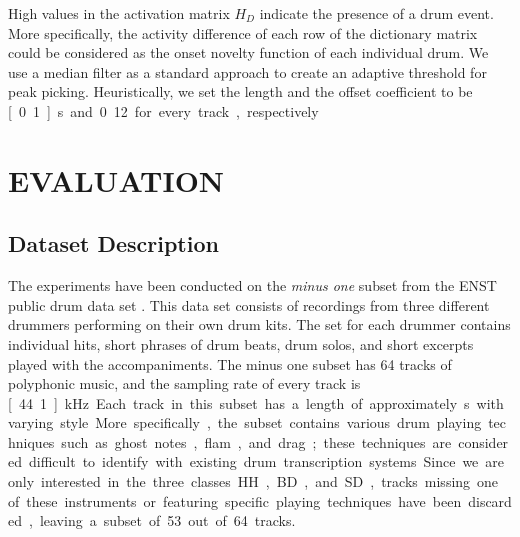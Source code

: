 \documentclass{article}
\begin{document}
High values in the activation matrix $H_D$ indicate the presence of a drum event. More specifically, the activity difference of each row of the dictionary matrix could be considered as the onset novelty function of each individual drum. We use a median filter as a standard approach to create an adaptive threshold for peak picking. Heuristically, we set the length and the offset coefficient to be \unit[0.1]{s} and 0.12 for every track, respectively. 
\vspace{-2mm}
\section{EVALUATION}\label{sec:Evaluation}
\subsection{Dataset Description}\label{subsec:data set description}

The experiments have been conducted on the \textit{minus one} subset from the ENST public drum data set \cite{gillet_enst-drums:_2006}. This data set consists of recordings from three different drummers performing on their own drum kits. The set for each drummer contains individual hits, short phrases of drum beats, drum solos, and short excerpts played with the accompaniments. The minus one subset has 64 tracks of polyphonic music, and the sampling rate of every track is \unit[44.1]{kHz}. Each track in this subset has a length of approximately \unit[70]{s} with varying style. More specifically, the subset contains various drum playing techniques such as ghost notes, flam, and drag; these techniques are considered difficult to identify with existing drum transcription systems. Since we are only interested in the three classes HH, BD, and SD, tracks missing one of these instruments or featuring specific playing techniques have been discarded, leaving a subset of 53 out of 64 tracks.
\end{document}
